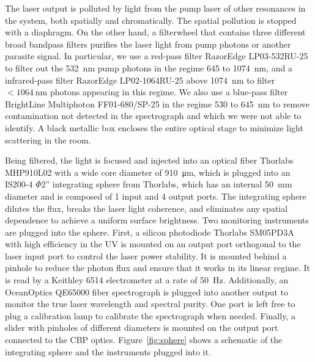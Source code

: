 The laser output is polluted by light from the pump laser of other resonances in the system, both spatially and chromatically. The spatial pollution is stopped with a diaphragm. On the other hand, a filterwheel that contains three different broad bandpass filters purifies the laser light from pump photons or another parasite signal. In particular, we use a red-pass filter RazorEdge LP03-532RU-25 to filter out the \SI{532}{\nano\meter} pump photons in the regime 645 to \SI{1074}{\nano\meter}, and a infrared-pass filter RazorEdge LP02-1064RU-25 above \SI{1074}{\nano\meter} to filter $<\SI{1064}{\nano\meter}$ photons appearing in this regime. We also use a blue-pass filter BrightLine Multiphoton FF01-680/SP-25 in the regime 530 to \SI{645}{\nano\meter} to remove contamination not detected in the spectrograph and which we were not able to identify. A black metallic box encloses the entire optical stage to minimize light scattering in the room.

Being filtered, the light is focused and injected into an optical fiber Thorlabs MHP910L02 with a wide core diameter of \SI{910}{\micro\meter}, which is plugged into an IS200-4 $\Phi$2'' integrating sphere from Thorlabs, which has an internal \SI{50}{\mm} diameter and is composed of 1 input and 4 output ports. The integrating sphere dilutes the flux, breaks the laser light coherence, and eliminates any spatial dependence to achieve a uniform surface brightness. Two monitoring instruments are plugged into the sphere. First, a silicon photodiode Thorlabs SM05PD3A with high efficiency in the UV is mounted on an output port orthogonal to the laser input port to control the laser power stability. It is mounted behind a pinhole to reduce the photon flux and ensure that it works in its linear regime. It is read by a Keithley 6514 electrometer at a rate of \SI{50}{\hertz}. Additionally, an OceanOptics QE65000 fiber spectrograph is plugged into another output to monitor the true laser wavelength and spectral purity. One port is left free to plug a calibration lamp to calibrate the spectrograph when needed. Finally, a slider with pinholes of different diameters is mounted on the output port connected to the CBP optics. Figure~\ref{fig:sphere} shows a schematic of the integrating sphere and the instruments plugged into it.

